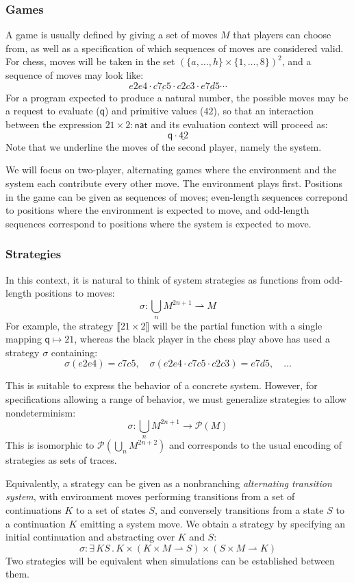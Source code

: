 \documentclass[acmsmall,timestamp,review]{acmart}
\newcommand{\kw}[1]{\ensuremath{ \mathsf{#1} }}
\begin{document}
\subsubsection{Games}

A game is usually defined by giving a set of moves $M$
that players can choose from,
as well as a specification of which
sequences of moves are considered valid.
For chess,
moves will be taken in the set $(\{a, \ldots, h\} \times \{1, \ldots, 8\})^2$,
and a sequence of moves may look like:
\[ e2e4 \cdot \underline{c7c5} \cdot c2c3 \cdot \underline{e7d5} \cdots \]
For a program expected to produce a natural number,
the possible moves may be a request to evaluate ($\kw{q}$)
and primitive values ($42$),
so that an interaction between the expression $21 \times 2 : \kw{nat}$
and its evaluation context will proceed as:
\[ \kw{q} \cdot \underline{42} \]
Note that we underline the moves of the second player,
namely the system.

We will focus on two-player, alternating games
where the environment and the system each contribute every other move.
The environment plays first.
Positions in the game can be given
as sequences of moves;
even-length sequences correpond to positions
where the environment is expected to move,
and odd-length sequences correspond to positions
where the system is expected to move.

\subsubsection{Strategies}

In this context,
it is natural to think of system strategies
as functions from odd-length positions to moves:
\[ \sigma : \bigcup_n M^{2n+1} \rightharpoonup M \]
For example,
the strategy $\llbracket 21 \times 2 \rrbracket$
will be the partial function with a single mapping $\kw{q} \mapsto 21$,
whereas the black player in the chess play above
has used a strategy $\sigma$ containing:
\[
  \sigma(e2e4) = c7c5 , \quad
  \sigma(e2e4 \cdot c7c5 \cdot c2c3) = e7d5 , \quad
  \ldots
\]

This is suitable to express the behavior of a concrete system.
However, for specifications allowing a range of behavior,
we must generalize strategies to allow nondeterminism:
\[ \sigma : \bigcup_n M^{2n+1} \rightarrow \mathcal{P}(M) \]
This is isomorphic to
$\mathcal{P}(\bigcup_n M^{2n+2})$
and corresponds to the usual encoding of strategies
as sets of traces.

Equivalently,
a strategy can be given as a
nonbranching
\emph{alternating transition system},
with environment moves performing transitions from
a set of continuations $K$ to a set of states $S$,
and conversely
transitions from a state $S$ to a continuation $K$
emitting a system move.
We obtain a strategy by
specifying an initial continuation and
abstracting over $K$ and $S$:
\[ \sigma : \exists \, K S \,.\, K \times
      (K \times M \rightharpoonup S) \times
      (S \times M \rightharpoonup K) \]
Two strategies will be equivalent
when simulations can be established between them.
\end{document}
